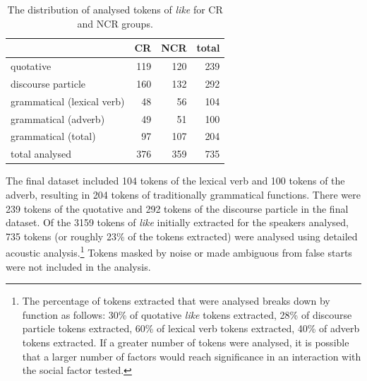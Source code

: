   
        
\begin{table}[htbp]
\caption{The distribution of analysed tokens of \textit{like} for CR and NCR groups.}
  \label{tab:tokensanalysed}
	 \begin{center}
		\begin{tabular}{lrrr}\hline
	
		& CR 	&	 NCR & total \\
              
  \hline
  
quotative & 119 & 120 & 239 \\
discourse particle & 160 & 132 & 292 \\
grammatical (lexical verb) & 48 & 56 & 104\\
grammatical (adverb) & 49  & 51 & 100 \\
grammatical (total) & 97 & 107 & 204 \\
total analysed      & 376 & 359 & 735 \\

\hline
		\end{tabular}
	
	\end{center}
\end{table}

The final dataset included 104 tokens of the lexical verb and 100 tokens of the adverb, resulting in 204 tokens of traditionally grammatical functions.  There were 239 tokens of the quotative and 292 tokens of the discourse particle in the final dataset.  Of the 3159 tokens of \textit{like} initially extracted for the speakers analysed, 735 tokens (or roughly	23\% of the tokens extracted) were analysed using detailed acoustic analysis.\footnote{The percentage of tokens extracted that were analysed breaks down by function as follows: 30\% of quotative \textit{like} tokens extracted, 28\% of discourse particle tokens extracted, 60\% of lexical verb tokens extracted, 40\% of adverb tokens extracted.  If a greater number of tokens were analysed, it is possible that a larger number of factors would reach significance in an interaction with the social factor tested.}  Tokens masked by noise or made ambiguous from false starts were not included in the analysis.  

